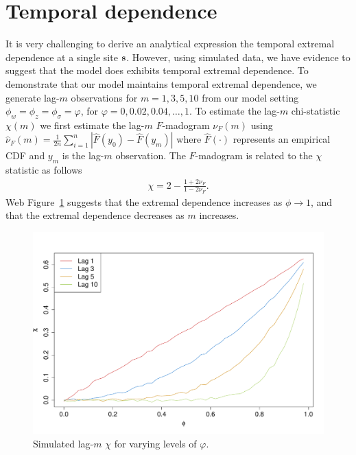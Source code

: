 \documentclass[useAMS,usenatbib,referee]{biomweb}
\renewcommand{\fref}[1]{Web Figure~\ref{#1}}
\begin{document}
\section{Temporal dependence} \label{sta:temporal}
It is very challenging to derive an analytical expression the temporal extremal dependence at a single site $\mbox{\bf s}$.
However, using simulated data, we have evidence to suggest that the model does exhibits temporal extremal dependence.
To demonstrate that our model maintains temporal extremal dependence, we generate lag-$m$ observations for $m = 1, 3, 5, 10$ from our model setting $\phi_w = \phi_z = \phi_\sigma = \varphi$, for $\varphi = 0, 0.02, 0.04, \ldots, 1$.
To estimate the lag-$m$ chi-statistic $\chi(m)$ we first estimate the lag-$m$ $F$-madogram $\nu_F(m)$ \citep{Cooley2006} using $\hat{\nu}_F(m) = \frac{1}{2n} \sum_{i = 1}^n | \hat{F}(y_{0}) - \hat{F}(y_{m})|$ where $\hat{F}(\cdot)$ represents an empirical CDF and $y_m$ is the lag-$m$ observation.
The $F$-madogram is related to the $\chi$ statistic as follows
\begin{align}
  \chi = 2 - \frac{1 + 2 \nu_F}{1 - 2 \nu_F}.
\end{align}
\fref{stfig:chiphi} suggests that the extremal dependence increases as $\phi \rightarrow 1$, and that the extremal dependence decreases as $m$ increases.
\begin{figure}
  \centering
  \includegraphics[width=\linewidth]{plots/chi-phi}
  \caption{Simulated lag-$m$ $\chi$ for varying levels of $\varphi$.}
  \label{stfig:chiphi}
\end{figure}
\end{document}
